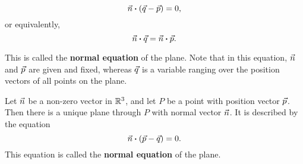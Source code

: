 \documentclass{ximera}
\begin{document}
\begin{equation*}
  \vec{n} \boldsymbol{\cdot} (\vec{q}-\vec{p}) = 0,
\end{equation*}
or equivalently,
\begin{equation*}
  \vec{n} \boldsymbol{\cdot} \vec{q} = \vec{n} \boldsymbol{\cdot} \vec{p}.
\end{equation*}

This is called the \textbf{normal equation} of the plane. Note that in
this equation, $\vec{n}$ and $\vec{p}$ are given and fixed, whereas
$\vec{q}$ is a variable ranging over the position vectors of all
points on the plane.



\begin{definition}\label{def:normal-equation-plane}

  Let $\vec{n}$ be a non-zero vector in $\mathbb{R}^3$, and let $P$ be a
  point with position vector $\vec{p}$. Then there is a unique plane through
  $P$ with normal vector $\vec{n}$. It is described by the equation
  \begin{equation*}
    \vec{n} \boldsymbol{\cdot} (\vec{p}-\vec{q}) = 0.
  \end{equation*}
  This equation is called the \textbf{normal equation} of the plane.
\end{definition}
\end{document}
